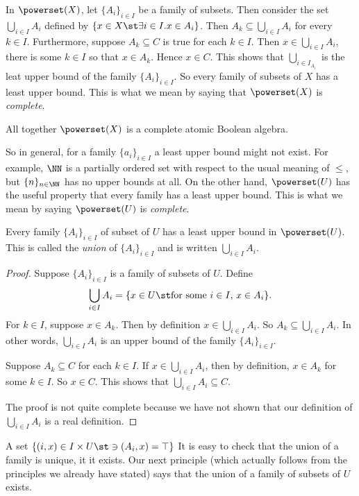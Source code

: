 In $\powerset(X)$, let $\{A_i\}_{i\in I}$ be a family of subsets. Then consider the set $\bigcup_{i\in I}A_i $ defined by $\{x\in X\st \exists i\in I. x\in A_i\}$. Then $A_k\subseteq \bigcup_{i\in I}A_i$ for every $k\in I$. Furthermore,
suppose $A_k\subseteq C$ is true for each $k\in I$. Then $x\in \bigcup_{i\in I}A_i$, there is some $k\in I$ so that $x\in A_k$. Hence $x\in C$. This shows that $\bigcup_{i\in I}_A_i$ is the leat upper bound of the family $\{A_i\}_{i\in I}$. So every family of subsets of $X$ has a least upper bound. This is what we mean by saying that $\powerset(X)$ is \emph{complete}.

All together $\powerset(X)$ is a complete atomic Boolean algebra. 
 
So in general, for a family $\{a_i\}_{i\in I}$ a least upper bound might not exist.
For example, $\NN$ is a partially ordered set with respect to the usual meaning of $\leq$, but $\{n\}_{n\in \NN}$ has no upper bounds at all.
On the other hand, $\powerset(U)$ has the useful property that every family has a least upper bound.
This is what we mean by saying $\powerset(U)$ is \emph{complete}. 

\begin{lemma}
	Every family $\{A_i\}_{i\in I}$ of subset of $U$ has a least upper bound in $\powerset(U)$.
	This is called the \emph{union} of $\{A_i\}_{i\in I}$ and is written $\bigcup_{i\in I}A_i$.
	
	\begin{proof}
		Suppose $\{A_i\}_{i\in I}$ is a family of subsets of $U$. 
		Define 
		\[\bigcup_{i\in I}A_i = \{x\in U\st \text{for some $i\in I$, $x\in A_i$}\}.\]
		For $k\in I$, suppose $x\in A_k$.
		Then by definition $x\in \bigcup_{i\in I}A_i$.
		So $A_k\subseteq \bigcup_{i\in I}A_i$.
		In other words, $\bigcup_{i\in I}A_i$ is an upper bound of the family $\{A_i\}_{i\in I}$.
		
		Suppose $A_k\subseteq C$ for each $k\in I$.
		If $x\in\bigcup_{i\in I}A_i$, then by definition, $x\in A_k$ for some $k\in I$.
		So $x\in C$.
		This shows that $\bigcup_{i\in I}A_i\subseteq C$.
		
		The proof is not quite complete because we have not shown that
		our definition of $\bigcup_{i\in I}A_i$ is a real definition.
 	\end{proof}
\end{lemma}

A set $\{(i,x)\in I\times U\st \ni(A_i,x)=\top\}$
It is easy to check that the union of a family is unique, it it exists. Our next principle (which actually follows from the principles we already have stated)
says that the union of a family of subsets of $U$ exists.
 


